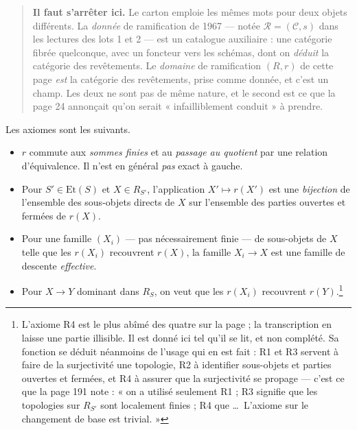 \documentclass[11pt,a4paper]{article}
\begin{document}
\begin{quote}
\textbf{Il faut s'arrêter ici.} Le carton emploie les mêmes mots pour deux
objets différents. La \emph{donnée} de ramification de 1967 --- notée
$\mathcal{R} = (\mathcal{C}, s)$ dans les lectures des lots 1 et 2 --- est un
catalogue auxiliaire : une catégorie fibrée quelconque, avec un foncteur vers
les schémas, dont on \emph{déduit} la catégorie des revêtements. Le
\emph{domaine} de ramification $(R, r)$ de cette page \emph{est} la catégorie
des revêtements, prise comme donnée, et c'est un champ. Les deux ne sont pas de
même nature, et le second est ce que la page 24 annonçait qu'on serait
« infailliblement conduit » à prendre.
\end{quote}

Les axiomes sont les suivants.

\begin{itemize}
\item[\textbf{R1}] $r$ commute aux \emph{sommes finies} et au \emph{passage au
  quotient} par une relation d'équivalence. Il n'est en général \emph{pas}
  exact à gauche.

\item[\textbf{R2}] Pour $S' \in \mathrm{Et}(S)$ et $X \in R_{S'}$,
  l'application $X' \mapsto r(X')$ est une \emph{bijection} de l'ensemble des
  sous-objets directs de $X$ sur l'ensemble des parties ouvertes et fermées de
  $r(X)$.

\item[\textbf{R3}] Pour une famille $(X_{i})$ --- pas nécessairement finie ---
  de sous-objets de $X$ telle que les $r(X_{i})$ recouvrent $r(X)$, la famille
  $X_{i} \to X$ est une famille de descente \emph{effective}.

\item[\textbf{R4}] Pour $X \to Y$ dominant dans $R_{S}$, on veut que les
  $r(X_{i})$ recouvrent $r(Y)$.\footnote{L'axiome R4 est le plus abîmé des
  quatre sur la page ; la transcription en laisse une partie illisible. Il est
  donné ici tel qu'il se lit, et non complété. Sa fonction se déduit néanmoins
  de l'usage qui en est fait : R1 et R3 servent à faire de la surjectivité une
  topologie, R2 à identifier sous-objets et parties ouvertes et fermées, et R4
  à assurer que la surjectivité se propage --- c'est ce que la page 191 note :
  « on a utilisé seulement R1 ; R3 signifie que les topologies sur $R_{S'}$
  sont localement finies ; R4 que \dots\ L'axiome sur le changement de base est
  trivial. »}
\end{itemize}
\end{document}
